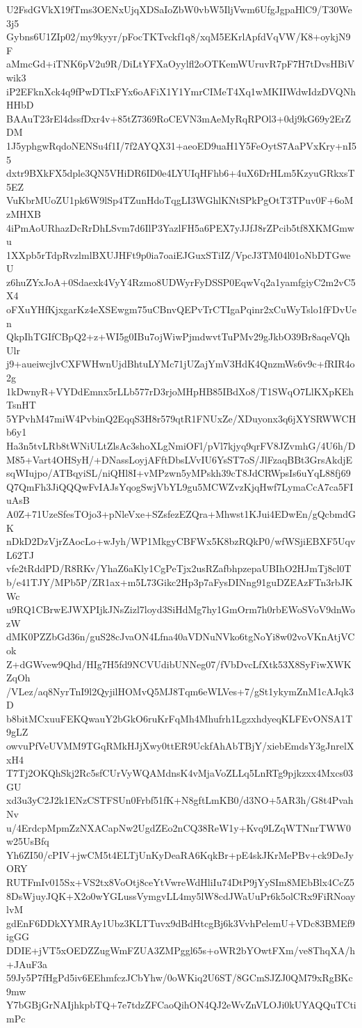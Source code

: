 U2FsdGVkX19fTms3OENxUjqXDSaIoZbW0vbW5IljVwm6UfgJgpaHlC9/T30We3j5
Gybns6U1ZIp02/my9kyyr/pFocTKTvckf1q8/xqM5EKrlApfdVqVW/K8+oykjN9F
aMmcGd+iTNK6pV2u9R/DiLtYFXaOyylfl2oOTKemWUruvR7pF7H7tDvsHBiVwik3
iP2EFknXck4q9fPwDTIxFYx6oAFiX1Y1YmrCIMeT4Xq1wMKIIWdwIdzDVQNhHHbD
BAAuT23rEl4dssfDxr4v+85tZ7369RoCEVN3mAeMyRqRPOl3+0dj9kG69y2ErZDM
1J5yphgwRqdoNENSu4f1I/7f2AYQX31+aeoED9uaH1Y5FeOytS7AaPVxKry+nI55
dxtr9BXkFX5dple3QN5VHiDR6ID0e4LYUIqHFhb6+4uX6DrHLm5KzyuGRkxsT5EZ
VuKbrMUoZU1pk6W9lSp4TZunHdoTqgLI3WGhlKNtSPkPgOtT3TPuv0F+6oMzMHXB
4iPmAoURhazDcRrDhLSvm7d6IlP3YazlFH5a6PEX7yJJfJ8rZPcib5tf8XKMGmwu
1XXpb5rTdpRvzlmlBXUJHFt9p0ia7oaiEJGuxSTiIZ/VpcJ3TM04l01oNbDTGweU
z6huZYxJoA+0Sdaexk4VyY4Rzmo8UDWyrFyDSSP0EqwVq2a1yamfgiyC2m2vC5X4
oFXuYHfKjxgarKz4eXSEwgm75uCBnvQEPvTrCTIgaPqinr2xCuWyTslo1fFDvUen
QkpIhTGIfCBpQ2+z+WI5g0IBu7ojWiwPjmdwvtTuPMv29gJkbO39Br8aqeVQhUlr
j9+aueiwcjlvCXFWHwnUjdBhtuLYMc71jUZajYmV3HdK4QnzmWs6v9c+fRIR4o2g
1kDwnyR+VYDdEmnx5rLLb577rD3rjoMHpHB85IBdXo8/T1SWqO7LlKXpKEhTsnHT
5YPvhM47miW4PvbinQ2EqqS3H8r579qtR1FNUxZe/XDuyonx3q6jXYSRWWCHb6y1
Ha3n5tvLRb8tWNiULtZlsAc3shoXLgNmiOFl/pVl7kjyq9qrFV8JZvmhG/4U6h/D
M85+Vart4OHSyH/+DNassLoyjAFftDbsLVvIU6YsST7oS/JlFzaqBBt3GrsAkdjE
sqWIujpo/ATBqyiSL/niQHl8I+vMPzwn5yMPskh39cT8JdCRWpsIs6uYqL88fj69
Q7QmFh3JiQQQwFvIAJsYqogSwjVbYL9gu5MCWZvzKjqHwf7LymaCcA7ca5FIuAsB
A0Z+71UzeSfesTOjo3+pNleVxe+SZsfezEZQra+Mhwst1KJui4EDwEn/gQcbmdGK
nDkD2DzVjrZAocLo+wJyh/WP1MkgyCBFWx5K8bzRQkP0/wfWSjiEBXF5UqvL62TJ
vfe2tRddPD/R8RKv/YhaZ6aKly1CgPeTjx2usRZafbhpzepaUBIhO2HJmTj8cl0T
b/e41TJY/MPb5P/ZR1ax+m5L73Gikc2Hp3p7aFysDINng91guDZEAzFTn3rbJKWc
u9RQ1CBrwEJWXPIjkJNsZizl7loyd3SiHdMg7hy1GmOrm7h0rbEWoSVoV9dnWozW
dMK0PZZbGd36n/guS28cJvaON4Lfna40aVDNuNVko6tgNoYi8w02voVKnAtjVCok
Z+dGWvew9Qhd/HIg7H5fd9NCVUdibUNNeg07/fVbDvcLfXtk53X8SyFiwXWKZqOh
/VLez/aq8NyrTnI9l2QyjilHOMvQ5MJ8Tqm6eWLVes+7/gSt1ykymZnM1cAJqk3D
b8bitMCxuuFEKQwauY2bGkO6ruKrFqMh4Mhufrh1LgzxhdyeqKLFEvONSA1T9gLZ
owvuPfVeUVMM9TGqRMkHJjXwy0ttER9UckfAhAbTBjY/xiebEmdsY3gJnrelXxH4
T7Tj2OKQhSkj2Rc5sfCUrVyWQAMdnsK4vMjaVoZLLq5LnRTg9pjkzxx4Mxcs03GU
xd3u3yC2J2k1ENzCSTFSUn0Frbf51fK+N8gftLmKB0/d3NO+5AR3h/G8t4PvahNv
u/4ErdcpMpmZzNXACapNw2UgdZEo2nCQ38ReW1y+Kvq9LZqWTNnrTWW0w25UsBfq
Yh6ZI50/cPIV+jwCM5t4ELTjUnKyDeaRA6KqkBr+pE4skJKrMePBv+ck9DeJyORY
RUTFmIv015Sx+VS2tx8VoOtj8ceYtVwreWdHliIu74DtP9jYySIm8MEbBlx4CcZ5
8DsWjuyJQK+X2o0wYGLussVymgvLL4my5lW8cdJWaUuPr6k5olCRx9FiRNoaylvM
gdEnF6DDkXYMRAy1Ubz3KLTTuvx9dBdHtcgBj6k3VvhPelemU+VDc83BMEf9igGG
DDIE+jVT5xOEDZZugWmFZUA3ZMPggl65s+oWR2bYOwtFXm/ve8ThqXA/h+JAuF3a
59Jy5P7fHgPd5iv6EEhmfczJCbYhw/0oWKiq2U6ST/8GCmSJZJ0QM79xRgBKc9mw
Y7bGBjGrNAIjhkpbTQ+7e7tdzZFCaoQihON4QJ2eWvZnVLOJi0kUYAQQuTCtimPc
